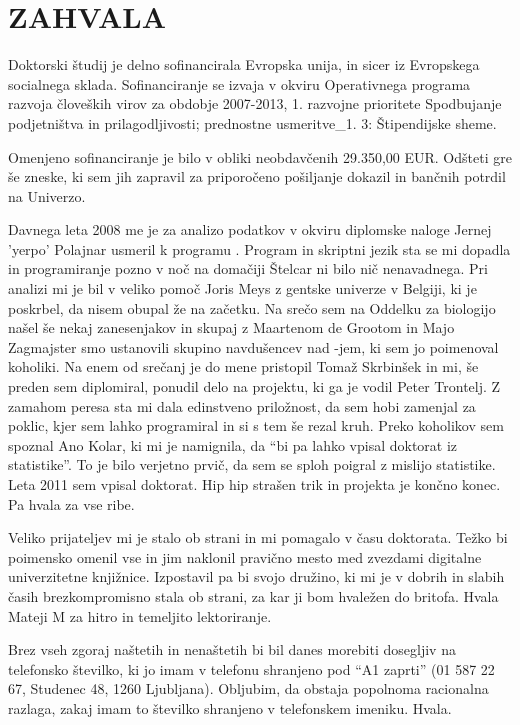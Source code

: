 \section*{ZAHVALA}

Doktorski študij je delno sofinancirala Evropska unija, in sicer iz Evropskega socialnega sklada. Sofinanciranje se izvaja v okviru Operativnega programa razvoja človeških virov za obdobje 2007-2013, 1. razvojne prioritete Spodbujanje podjetništva in prilagodljivosti; prednostne usmeritve\_1. 3: Štipendijske sheme.

Omenjeno sofinanciranje je bilo v obliki neobdavčenih 29.350,00 EUR. Odšteti gre še zneske, ki sem jih zapravil za priporočeno pošiljanje dokazil in bančnih potrdil na Univerzo.

Davnega leta 2008 me je za analizo podatkov v okviru diplomske naloge Jernej 'yerpo' Polajnar usmeril k programu . Program in skriptni jezik sta se mi dopadla in programiranje pozno v noč na domačiji Štelcar ni bilo nič nenavadnega. Pri analizi mi je bil v veliko pomoč Joris Meys z gentske univerze v Belgiji, ki je poskrbel, da nisem obupal že na začetku. Na srečo sem na Oddelku za biologijo našel še nekaj zanesenjakov in skupaj z Maartenom de Grootom in Majo Zagmajster smo ustanovili skupino navdušencev nad -jem, ki sem jo poimenoval koholiki. Na enem od srečanj je do mene pristopil Tomaž Skrbinšek in mi, še preden sem diplomiral, ponudil delo na projektu, ki ga je vodil Peter Trontelj. Z zamahom peresa sta mi dala edinstveno priložnost, da sem hobi zamenjal za poklic, kjer sem lahko programiral in si s tem še rezal kruh. Preko koholikov sem spoznal Ano Kolar, ki mi je namignila, da ``bi pa lahko vpisal doktorat iz statistike''. To je bilo verjetno prvič, da sem se sploh poigral z mislijo statistike. Leta 2011 sem vpisal doktorat. Hip hip strašen trik in projekta je končno konec. Pa hvala za vse ribe.

Veliko prijateljev mi je stalo ob strani in mi pomagalo v času doktorata. Težko bi poimensko omenil vse in jim naklonil pravično mesto med zvezdami digitalne univerzitetne knjižnice. Izpostavil pa bi svojo družino, ki mi je v dobrih in slabih časih brezkompromisno stala ob strani, za kar ji bom hvaležen do britofa. Hvala Mateji M za hitro in temeljito lektoriranje.

Brez vseh zgoraj naštetih in nenaštetih bi bil danes morebiti dosegljiv na telefonsko številko, ki jo imam v telefonu shranjeno pod ``A1 zaprti'' (01 587 22 67, Studenec 48, 1260 Ljubljana). Obljubim, da obstaja popolnoma racionalna razlaga, zakaj imam to številko shranjeno v telefonskem imeniku. Hvala.
